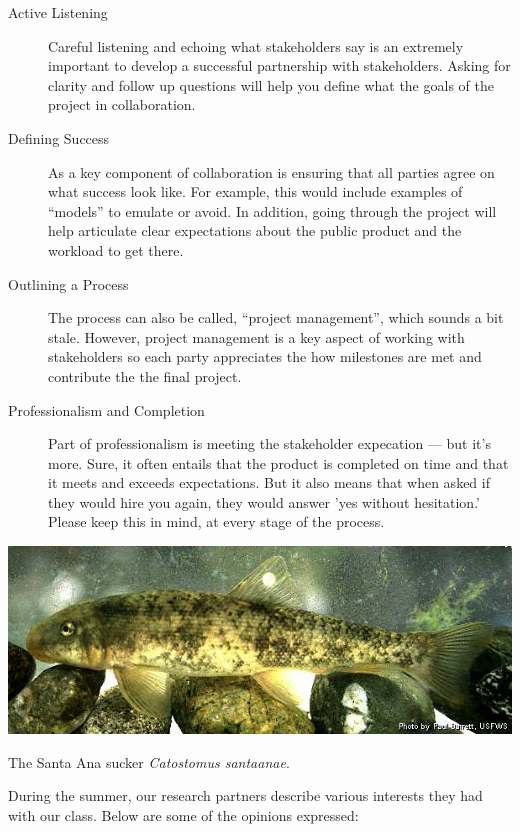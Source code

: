 \documentclass{tufte-handout}\usepackage[]{graphicx}\usepackage[]{color}
\begin{document}
\begin{description}
  \item[Active Listening] Careful listening and echoing what stakeholders say is an extremely important to develop a successful partnership with stakeholders. Asking for clarity and follow up questions will help you define what the goals of the project in collaboration.
  \item[Defining Success] As a key component of collaboration is ensuring that all parties agree on what success look like. For example, this would include examples of ``models'' to emulate or avoid. In addition, going through the project will help articulate clear expectations about the public product and the workload to get there.
  \item[Outlining a Process] The process can also be called, ``project management'', which sounds a bit stale. However, project management is a key aspect of working with stakeholders so each party appreciates the how milestones are met and contribute the the final project. 
  \item[Professionalism and Completion] Part of professionalism is meeting the stakeholder expecation --- but it's more. Sure, it often entails that the product is completed on time and that it meets and exceeds expectations. But it also means that when asked if they would hire you again, they would answer 'yes without hesitation.'  Please keep this in mind, at every stage of the process.  
\end{description}

\begin{marginfigure}
   \includegraphics[width=1.0\textwidth]{sucker_images/Catostomus_santaanae.jpg}
  \caption{The Santa Ana sucker \emph{Catostomus santaanae}.}
\end{marginfigure}

During the summer, our research partners describe various interests they had with our class. Below are some of the opinions expressed:
\end{document}
